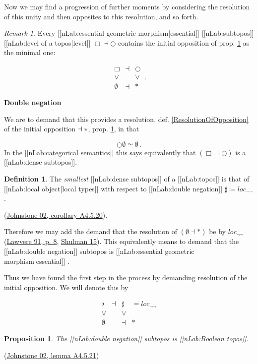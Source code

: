\documentclass[12pt,titlepage]{article}
\newcommand{\itexarray}[1]{\begin{matrix}#1\end{matrix}}
\theoremstyle{plain}
\newtheorem{prop}{Proposition}
\theoremstyle{definition}
\newtheorem{defn}{Definition}
\theoremstyle{remark}
\newtheorem{remark}{Remark}
\begin{document}
Now we may find a progression of further moments by considering the resolution of this unity and then opposites to this resolution, and so forth.

\begin{remark}
\label{}\hypertarget{}{}
Every [[nLab:essential geometric morphism|essential]] [[nLab:subtopos]] [[nLab:level of a topos|level]] $\Box \dashv \bigcirc$ contains the initial opposition of prop. \ref{InitialOpposition} as the minimal one:

\begin{displaymath}
\itexarray{
     \Box &\dashv& \bigcirc
     \\
     \vee && \vee
     \\
     \emptyset &\dashv& \ast
  }
  \,.
\end{displaymath}
\end{remark}
 \textbf{Double negation}

We are to demand that this provides a resolution, def. \ref{ResolutionOfOpposition} of the initial opposition $\empty \dashv \ast$, prop. \ref{InitialOpposition}, in that

\begin{displaymath}
\bigcirc \emptyset \simeq \emptyset
  \,.
\end{displaymath}
In the [[nLab:categorical semantics]] this says equivalently that $(\Box \dashv \bigcirc)$ is a [[nLab:dense subtopos]].

\begin{defn}
\label{InitialOpposition}\hypertarget{InitialOpposition}{}
The \emph{smallest} [[nLab:dense subtopos]] of a [[nLab:topos]] is that of [[nLab:local object|local types]] with respect to [[nLab:double negation]] $\sharp \coloneqq loc_{\neg \neg}$.

\end{defn}
(\hyperlink{Johnstone02}{Johnstone 02, corollary A4.5.20}).

Therefore we may add the demand that the resolution of $(\emptyset \dashv \ast)$ be by $loc_{\neg \neg}$ (\hyperlink{Lawvere91}{Lawvere 91, p. 8}, \href{}{Shulman 15}). This equivalently means to demand that the [[nLab:double negation]] subtopos is [[nLab:essential geometric morphism|essential]] .

Thus we have found the first step in the process by demanding resolution of the initial opposition. We will denote this by

\begin{displaymath}
\itexarray{
     \flat &\dashv& \sharp & = loc_{\neg \neg}
     \\
     \vee && \vee
     \\
     \emptyset &&\dashv& \ast
  }
\end{displaymath}
\begin{prop}
\label{}\hypertarget{}{}
The [[nLab:double negation]] subtopos is [[nLab:Boolean topos]].

\end{prop}
(\hyperlink{Johnstone02}{Johnstone 02, lemma A4.5.21})
\end{document}
